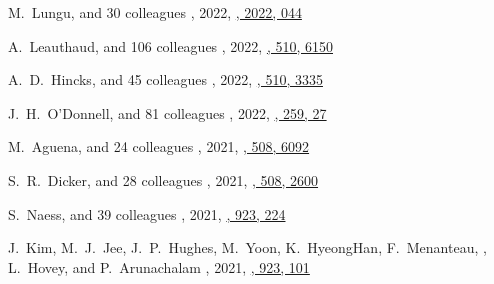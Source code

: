 \begin{etaremune}
\item
M.~Lungu, and 30 colleagues
,
2022, \href{https://ui.adsabs.harvard.edu/abs/2022JCAP...05..044L}{\jcap, 2022, 044}

\item
A.~Leauthaud, and 106 colleagues
,
2022, \href{https://ui.adsabs.harvard.edu/abs/2022MNRAS.510.6150L}{\mnras, 510, 6150}

\item
A.~D.~Hincks, and 45 colleagues
,
2022, \href{https://ui.adsabs.harvard.edu/abs/2022MNRAS.510.3335H}{\mnras, 510, 3335}

\item
J.~H.~O'Donnell, and 81 colleagues
,
2022, \href{https://ui.adsabs.harvard.edu/abs/2022ApJS..259...27O}{\apjs, 259, 27}

\item
M.~Aguena, and 24 colleagues
,
2021, \href{https://ui.adsabs.harvard.edu/abs/2021MNRAS.508.6092A}{\mnras, 508, 6092}

\item
S.~R.~Dicker, and 28 colleagues
,
2021, \href{https://ui.adsabs.harvard.edu/abs/2021MNRAS.508.2600D}{\mnras, 508, 2600}

\item
S.~Naess, and 39 colleagues
,
2021, \href{https://ui.adsabs.harvard.edu/abs/2021ApJ...923..224N}{\apj, 923, 224}

\item
J.~Kim, M.~J.~Jee, J.~P.~Hughes, M.~Yoon, K.~HyeongHan, F.~Menanteau, \myself, L.~Hovey, and P.~Arunachalam
,
2021, \href{https://ui.adsabs.harvard.edu/abs/2021ApJ...923..101K}{\apj, 923, 101}


\end{etaremune}
